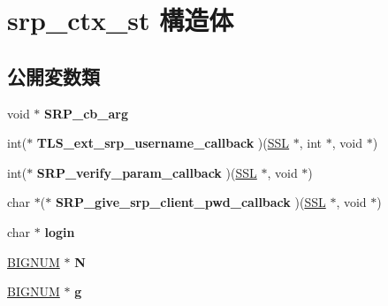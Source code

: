 \hypertarget{structsrp__ctx__st}{}\section{srp\+\_\+ctx\+\_\+st 構造体}
\label{structsrp__ctx__st}
\subsection*{公開変数類}
\begin{DoxyCompactItemize}
\item 
\hypertarget{structsrp__ctx__st_aa49970f50ded55c00d44e1601b40c9b1}{}void $\ast$ {\bfseries S\+R\+P\+\_\+cb\+\_\+arg}\label{structsrp__ctx__st_aa49970f50ded55c00d44e1601b40c9b1}

\item 
\hypertarget{structsrp__ctx__st_a51a70bcd9e36e89c1d44bb74275ad4f3}{}int($\ast$ {\bfseries T\+L\+S\+\_\+ext\+\_\+srp\+\_\+username\+\_\+callback} )(\hyperlink{structssl__st}{S\+S\+L} $\ast$, int $\ast$, void $\ast$)\label{structsrp__ctx__st_a51a70bcd9e36e89c1d44bb74275ad4f3}

\item 
\hypertarget{structsrp__ctx__st_a3669dc44f2e7e4ed6ad7fe524187e70e}{}int($\ast$ {\bfseries S\+R\+P\+\_\+verify\+\_\+param\+\_\+callback} )(\hyperlink{structssl__st}{S\+S\+L} $\ast$, void $\ast$)\label{structsrp__ctx__st_a3669dc44f2e7e4ed6ad7fe524187e70e}

\item 
\hypertarget{structsrp__ctx__st_a800d2c5a1a2cf2f5f165e0f9c223d86b}{}char $\ast$($\ast$ {\bfseries S\+R\+P\+\_\+give\+\_\+srp\+\_\+client\+\_\+pwd\+\_\+callback} )(\hyperlink{structssl__st}{S\+S\+L} $\ast$, void $\ast$)\label{structsrp__ctx__st_a800d2c5a1a2cf2f5f165e0f9c223d86b}

\item 
\hypertarget{structsrp__ctx__st_a9406590abd27d1bfb79b3f76c27b9c29}{}char $\ast$ {\bfseries login}\label{structsrp__ctx__st_a9406590abd27d1bfb79b3f76c27b9c29}

\item 
\hypertarget{structsrp__ctx__st_a207fb6e32702e2be6e8477d3acb19ddc}{}\hyperlink{structbignum__st}{B\+I\+G\+N\+U\+M} $\ast$ {\bfseries N}\label{structsrp__ctx__st_a207fb6e32702e2be6e8477d3acb19ddc}

\item 
\hypertarget{structsrp__ctx__st_a92c5d7f90a3fca1bbb24d6046ad69aa6}{}\hyperlink{structbignum__st}{B\+I\+G\+N\+U\+M} $\ast$ {\bfseries g}\label{structsrp__ctx__st_a92c5d7f90a3fca1bbb24d6046ad69aa6}


\end{DoxyCompactItemize}
